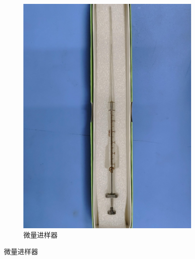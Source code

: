 \documentclass[a4paper]{report} %
\begin{document}
\begin{figure}[htbp]
\begin{subfigure}{0.22\textwidth}
        \includegraphics[width=\linewidth]{微量进样器.jpg}
        \caption{微量进样器}
    \end{subfigure}


\end{figure}
\end{document}
